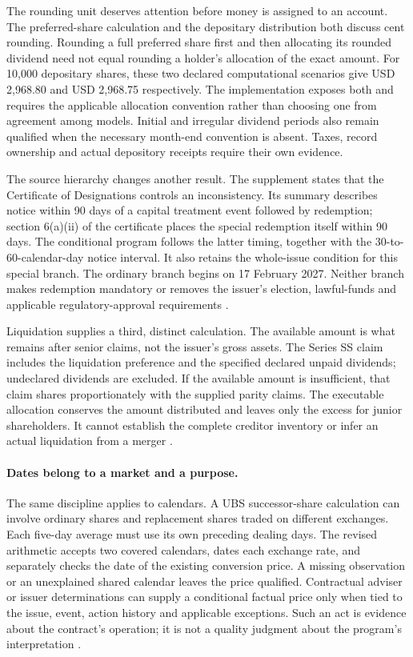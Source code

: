 \documentclass[12pt,a4paper,oneside,openany]{book}
\begin{document}
The rounding unit deserves attention before money is assigned to an account.
The preferred-share calculation and the depositary distribution both discuss
cent rounding. Rounding a full preferred share first and then allocating its
rounded dividend need not equal rounding a holder's allocation of the exact
amount. For 10,000 depositary shares, these two declared computational scenarios
give USD 2,968.80 and USD 2,968.75 respectively. The implementation exposes both
and requires the applicable allocation convention rather than choosing one
from agreement among models. Initial and irregular dividend periods also
remain qualified when the necessary month-end convention is absent. Taxes,
record ownership and actual depository receipts require their own evidence.

The source hierarchy changes another result. The supplement states that the
Certificate of Designations controls an inconsistency. Its summary describes
notice within 90 days of a capital treatment event followed by redemption;
section 6(a)(ii) of the certificate places the special redemption itself within
90 days. The conditional program follows the latter timing, together with
the 30-to-60-calendar-day notice interval. It also retains the whole-issue
condition for this special branch. The ordinary branch begins on 17 February
2027. Neither branch makes redemption mandatory or removes the issuer's
election, lawful-funds and applicable regulatory-approval requirements
\citep[pp.~S-16, S-19--S-20]{bofass2022}
\citep[sections~6(a)--(b)]{bofasscertificate2022}.

Liquidation supplies a third, distinct calculation. The available amount is
what remains after senior claims, not the issuer's gross assets. The Series SS
claim includes the liquidation preference and the specified declared unpaid
dividends; undeclared dividends are excluded. If the available amount is
insufficient, that claim shares proportionately with the supplied parity
claims. The executable allocation conserves the amount distributed and leaves
only the excess for junior shareholders. It cannot establish the complete
creditor inventory or infer an actual liquidation from a merger
\citep[p.~S-19]{bofass2022}.

\paragraph{Dates belong to a market and a purpose.}
The same discipline applies to calendars. A UBS successor-share calculation
can involve ordinary shares and replacement shares traded on different
exchanges. Each five-day average must use its own preceding dealing days.
The revised arithmetic accepts two covered calendars, dates each exchange
rate, and separately checks the date of the existing conversion price.
A missing observation or an unexplained shared calendar leaves the price
qualified. Contractual adviser or issuer determinations can supply a
conditional factual price only when tied to the issue, event, action history
and applicable exceptions. Such an act is evidence about the contract's
operation; it is not a quality judgment about the program's interpretation
\citep[conditions~8(d)--(e), 8(m)--(n)]{ubsat12024}.
\end{document}
